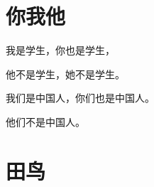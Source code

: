 \documentclass[12pt,UTF-8,openany]{ctexbook}
\begin{document}
\hanzibox{}\hanzibox{}\hanzibox{}\hanzibox{}\hspace{1em}\hanzibox{}\hanzibox{}\hanzibox{}\hanzibox{}

\hanzibox{}\hanzibox{}\hanzibox{}\hanzibox{}\hspace{1em}\hanzibox{}\hanzibox{}\hanzibox{}\hanzibox{}

\hanzibox{}\hanzibox{}\hanzibox{}\hanzibox{}\hspace{1em}




\chapter{你我他}

\begin{large}
    
    我是学生，你也是学生，
    
    他不是学生，她不是学生。
    
    我们是中国人，你们也是中国人。
    
    他们不是中国人。
    
\end{large}


\clearpage

\begin{center}
    
\end{center}


\hanzibox{}\hanzibox{}\hanzibox{}\hanzibox{}\hspace{1em}\hanzibox{}\hanzibox{}\hanzibox{}\hanzibox{}

\hanzibox{}\hanzibox{}\hanzibox{}\hanzibox{}\hspace{1em}\hanzibox{}\hanzibox{}\hanzibox{}\hanzibox{}

\hanzibox{}\hanzibox{}\hanzibox{}\hanzibox{}\hspace{1em}\hanzibox{}\hanzibox{}\hanzibox{}\hanzibox{}

\hanzibox{}\hanzibox{}\hanzibox{}\hanzibox{}\hspace{1em}\hanzibox{}\hanzibox{}\hanzibox{}\hanzibox{}






\chapter{田鸟}
\end{document}
